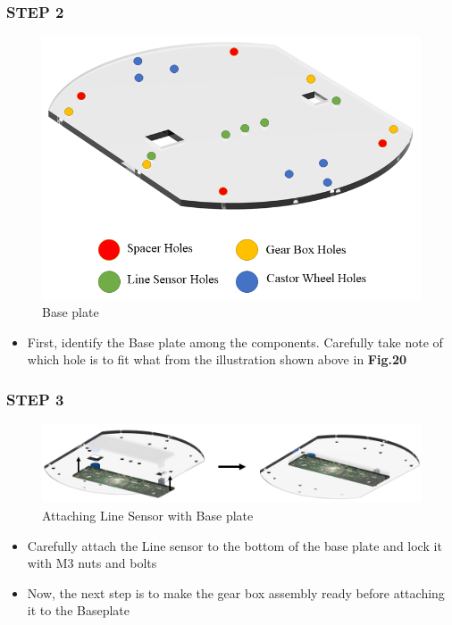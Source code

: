 \documentclass[12pt,a4paper,oneside]{book}
\begin{document}
				
			\subsubsection*{STEP 2}
				\begin{figure}[H]
					\begin{center}
						\includegraphics[scale=0.75]{BASEPLATE MARKED}
						\caption{Base plate}
					\end{center}
				\end{figure}
				\begin{itemize}
					\item First, identify the Base plate among the components. Carefully take note of which hole is to fit what from the illustration shown above in \textbf{Fig.20}
				\end{itemize}
				\pagebreak

			\subsubsection*{STEP 3}
				\begin{figure}[H]
					\begin{center}
						\includegraphics[scale=0.55]{ATTACHING LINE SENSOR}
						\caption{Attaching Line Sensor with Base plate}
					\end{center}
				\end{figure}
				\begin{itemize}
					\item Carefully attach the Line sensor to the bottom of the base plate and lock it with M3 nuts and bolts
					\item Now, the next step is to make the gear box assembly ready before attaching it to the Baseplate
				\end{itemize}
				
\end{document}
